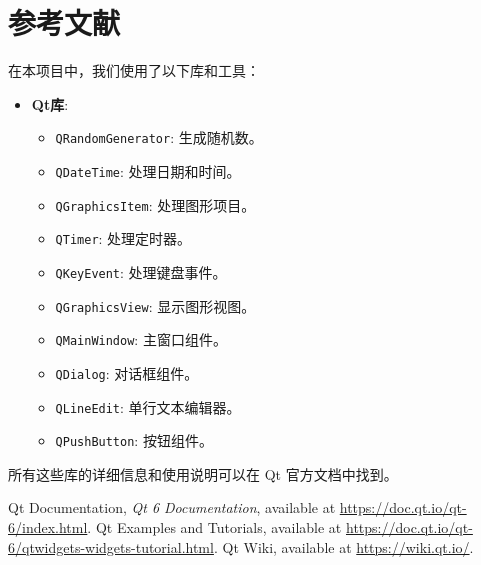 \documentclass[UTF8]{ctexart}
\begin{document}
\section{参考文献}

在本项目中，我们使用了以下库和工具：

\begin{itemize}
    \item \textbf{Qt库}:
    \begin{itemize}
        \item \texttt{QRandomGenerator}: 生成随机数。
        \item \texttt{QDateTime}: 处理日期和时间。
        \item \texttt{QGraphicsItem}: 处理图形项目。
        \item \texttt{QTimer}: 处理定时器。
        \item \texttt{QKeyEvent}: 处理键盘事件。
        \item \texttt{QGraphicsView}: 显示图形视图。
        \item \texttt{QMainWindow}: 主窗口组件。
        \item \texttt{QDialog}: 对话框组件。
        \item \texttt{QLineEdit}: 单行文本编辑器。
        \item \texttt{QPushButton}: 按钮组件。
    \end{itemize}
\end{itemize}

所有这些库的详细信息和使用说明可以在 Qt 官方文档中找到\cite{qt_documentation}。

\begin{thebibliography}{99}
     Qt Documentation, \textit{Qt 6 Documentation}, available at \url{https://doc.qt.io/qt-6/index.html}.
     Qt Examples and Tutorials, available at \url{https://doc.qt.io/qt-6/qtwidgets-widgets-tutorial.html}.
     Qt Wiki, available at \url{https://wiki.qt.io/}.
\end{thebibliography}
\end{document}
